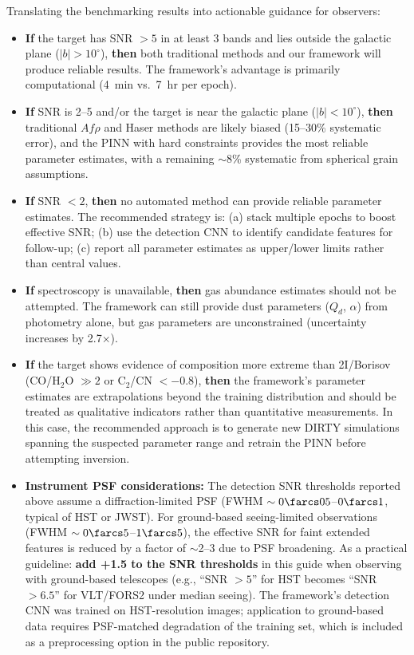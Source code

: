 \documentclass[usenatbib]{mnras}
\begin{document}
Translating the benchmarking results into actionable guidance for observers:

\begin{itemize}
    \item \textbf{If} the target has SNR $>5$ in at least 3 bands and lies outside the galactic plane ($|b| > 10^\circ$), \textbf{then} both traditional methods and our framework will produce reliable results. The framework's advantage is primarily computational (4~min vs.\ 7~hr per epoch).

    \item \textbf{If} SNR is 2--5 and/or the target is near the galactic plane ($|b| < 10^\circ$), \textbf{then} traditional $Af\rho$ and Haser methods are likely biased (15--30\% systematic error), and the PINN with hard constraints provides the most reliable parameter estimates, with a remaining $\sim$8\% systematic from spherical grain assumptions.

    \item \textbf{If} SNR $<2$, \textbf{then} no automated method can provide reliable parameter estimates. The recommended strategy is: (a) stack multiple epochs to boost effective SNR; (b) use the detection CNN to identify candidate features for follow-up; (c) report all parameter estimates as upper/lower limits rather than central values.

    \item \textbf{If} spectroscopy is unavailable, \textbf{then} gas abundance estimates should not be attempted. The framework can still provide dust parameters ($Q_d$, $\alpha$) from photometry alone, but gas parameters are unconstrained (uncertainty increases by 2.7$\times$).

    \item \textbf{If} the target shows evidence of composition more extreme than 2I/Borisov (CO/H$_2$O $\gg 2$ or C$_2$/CN $<-0.8$), \textbf{then} the framework's parameter estimates are extrapolations beyond the training distribution and should be treated as qualitative indicators rather than quantitative measurements. In this case, the recommended approach is to generate new DIRTY simulations spanning the suspected parameter range and retrain the PINN before attempting inversion.
    \item \textbf{Instrument PSF considerations:} The detection SNR thresholds reported above assume a diffraction-limited PSF (FWHM $\sim 0\farcs05$--$0\farcs1$, typical of HST or JWST). For ground-based seeing-limited observations (FWHM $\sim 0\farcs5$--$1\farcs5$), the effective SNR for faint extended features is reduced by a factor of $\sim$2--3 due to PSF broadening. As a practical guideline: \textbf{add +1.5 to the SNR thresholds} in this guide when observing with ground-based telescopes (e.g., ``SNR $>5$'' for HST becomes ``SNR $>6.5$'' for VLT/FORS2 under median seeing). The framework's detection CNN was trained on HST-resolution images; application to ground-based data requires PSF-matched degradation of the training set, which is included as a preprocessing option in the public repository.
\end{itemize}
\end{document}
